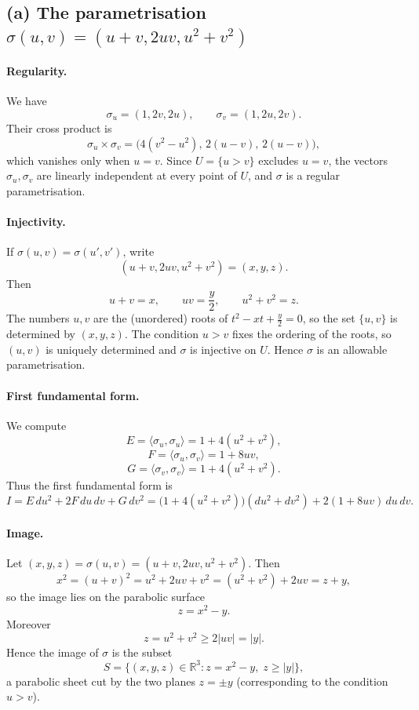 \documentclass[12pt,a4paper]{article}
\theoremstyle{plain}
\theoremstyle{definition}      %
\begin{document}
	\subsection*{(a) The parametrisation $\sigma(u,v)=(u+v,2uv,u^2+v^2)$}
	
	\paragraph{Regularity.}
	We have
	\[
	\sigma_u = (1,2v,2u),\qquad
	\sigma_v = (1,2u,2v).
	\]
	Their cross product is
	\[
	\sigma_u\times\sigma_v
	= \bigl(4(v^2-u^2),\,2(u-v),\,2(u-v)\bigr),
	\]
	which vanishes only when $u=v$.  Since $U=\{u>v\}$ excludes $u=v$, the vectors
	$\sigma_u,\sigma_v$ are linearly independent at every point of $U$, and
	$\sigma$ is a regular parametrisation.
	
	\paragraph{Injectivity.}
	If $\sigma(u,v)=\sigma(u',v')$, write
	\[
	(u+v,2uv,u^2+v^2) = (x,y,z).
	\]
	Then
	\[
	u+v=x,\qquad uv=\frac{y}{2},\qquad u^2+v^2=z.
	\]
	The numbers $u,v$ are the (unordered) roots of $t^2-xt+\frac{y}{2}=0$, so the
	set $\{u,v\}$ is determined by $(x,y,z)$.  The condition $u>v$ fixes the
	ordering of the roots, so $(u,v)$ is uniquely determined and $\sigma$ is
	injective on $U$.  Hence $\sigma$ is an allowable parametrisation.
	
	\paragraph{First fundamental form.}
	We compute
	\[
	E = \langle\sigma_u,\sigma_u\rangle
	= 1+4(u^2+v^2),
	\]
	\[
	F = \langle\sigma_u,\sigma_v\rangle
	= 1+8uv,
	\]
	\[
	G = \langle\sigma_v,\sigma_v\rangle
	= 1+4(u^2+v^2).
	\]
	Thus the first fundamental form is
	\[
	I = E\,du^2 + 2F\,du\,dv + G\,dv^2
	= \bigl(1+4(u^2+v^2)\bigr)(du^2+dv^2) + 2(1+8uv)\,du\,dv.
	\]
	
	\paragraph{Image.}
	Let $(x,y,z)=\sigma(u,v)=(u+v,2uv,u^2+v^2)$.  Then
	\[
	x^2 = (u+v)^2 = u^2+2uv+v^2 = (u^2+v^2)+2uv = z+y,
	\]
	so the image lies on the parabolic surface
	\[
	z = x^2 - y.
	\]
	Moreover
	\[
	z = u^2+v^2 \ge 2|uv| = |y|.
	\]
	Hence the image of $\sigma$ is the subset
	\[
	S = \{(x,y,z)\in\mathbb{R}^3 : z = x^2 - y,\; z\ge |y|\},
	\]
	a parabolic sheet cut by the two planes $z=\pm y$ (corresponding to the
	condition $u>v$).
	
\end{document}
